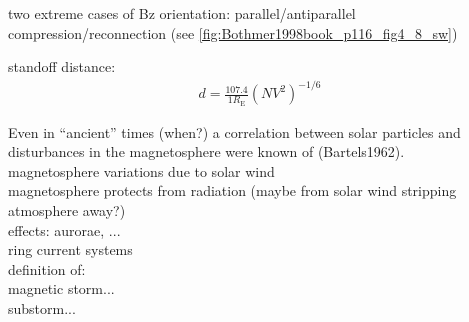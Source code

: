 two extreme cases of Bz orientation: parallel/antiparallel\\
compression/reconnection (see \autoref{fig:Bothmer1998book_p116_fig4_8_sw})\\
\begin{figure}[htb]
\end{figure}

standoff distance:	\citep[p.~112]{Bothmer2007}
\begin{align}
	d = \frac{107.4}{1 R_\text{E}} (N V^2)^{-1/6}
\end{align}

Even in ``ancient'' times (when?) a correlation between solar particles and disturbances in the magnetosphere were known of (Bartels1962).\\

magnetosphere variations due to solar wind\\
magnetosphere protects from radiation (maybe from solar wind stripping atmosphere away?)\\

effects: aurorae, ...\\

ring current systems\\

definition of:\\
magnetic storm...\\
substorm...\\

